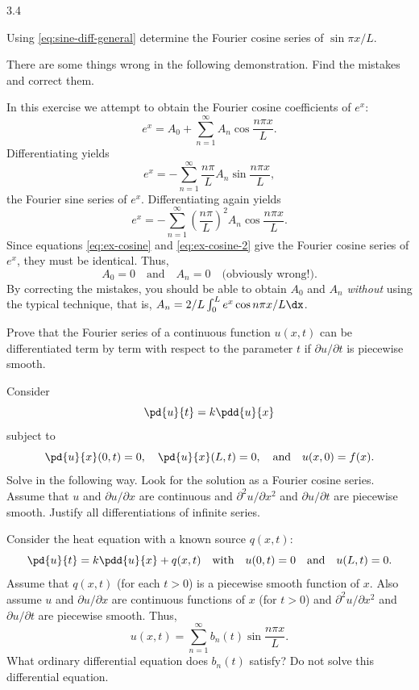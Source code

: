 \begin{exercises}{3.4}
\item Using \eqref{eq:sine-diff-general} determine the Fourier cosine series of $\sin \pi x/L$.

\item There are some things wrong in the following demonstration.  Find the mistakes and correct them.

In this exercise we attempt to obtain the Fourier cosine coefficients of $e^x$:
\begin{equation}
\label{eq:ex-cosine}
e^x = A_0 + \sum_{n=1}^{\infty} A_n \cos \frac{n\pi x}{L}.
\end{equation}
Differentiating yields
\[
e^x = -\sum_{n=1}^{\infty} \frac{n\pi}{L} A_n \sin \frac{n\pi x}{L},
\]
the Fourier sine series of $e^x$.  Differentiating again yields
\begin{equation}
\label{eq:ex-cosine-2}
e^x = -\sum_{n=1}^{\infty} \left(\frac{n\pi}{L}\right)^2 A_n \cos \frac{n\pi x}{L}.
\end{equation}
Since equations \eqref{eq:ex-cosine} and \eqref{eq:ex-cosine-2} give the Fourier cosine series of $e^x$, they must be identical.  Thus,
\[
A_0 = 0 \quad \text{and} \quad A_n = 0 \quad \text{(obviously wrong!).}
\]
By correcting the mistakes, you should be able to obtain $A_0$ and $A_n$ \textit{without} using the typical technique, that is, $A_n = 2/L \int_0^L e^x \cos n\pi x/L \dx$.

\item Prove that the Fourier series of a continuous function $u(x,t)$ can be differentiated term by term with respect to the parameter $t$ if $\partial u/\partial t$ is piecewise smooth.

\item Consider
\[
\pd{u}{t} = k\pdd{u}{x}
\]
subject to
\[
\pd{u}{x}(0,t) = 0, \quad \pd{u}{x}(L,t) = 0, \quad \text{and} \quad u(x,0) = f(x).
\]
Solve in the following way.  Look for the solution as a Fourier cosine series.  Assume that $u$ and $\partial u/\partial x$ are continuous and $\partial^2 u/\partial x^2$ and $\partial u/\partial t$ are piecewise smooth.  Justify all differentiations of infinite series.

\item[\starred 3.4.9] Consider the heat equation with a known source $q(x,t)$:
\[
\pd{u}{t} = k\pdd{u}{x} + q(x,t) \quad \text{with} \quad u(0,t) = 0 \quad \text{and} \quad u(L,t) = 0.
\]
Assume that $q(x,t)$ (for each $t > 0$) is a piecewise smooth function of $x$.  Also assume $u$ and $\partial u/\partial x$ are continuous functions of $x$ (for $t > 0$) and $\partial^2 u/\partial x^2$ and $\partial u/\partial t$ are piecewise smooth.  Thus,
\[
u(x,t) = \sum_{n=1}^{\infty} b_n(t) \sin \frac{n\pi x}{L}.
\]
What ordinary differential equation does $b_n(t)$ satisfy?  Do not solve this differential equation.


\end{exercises}
